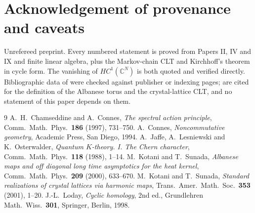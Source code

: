 \documentclass[11pt]{amsart}
\numberwithin{equation}{section}
\theoremstyle{definition}
\theoremstyle{remark}
\newcommand{\C}{\mathbb{C}}
\newcommand{\HC}{\mathit{HC}}
\begin{document}
\section*{Acknowledgement of provenance and caveats}

Unrefereed preprint. Every numbered statement is proved from Papers II, IV and IX and
finite linear algebra, plus the Markov-chain CLT and Kirchhoff's theorem in cycle form.
The vanishing of $\HC^{1}(\C^{N})$ is both quoted \cite{Lo} and verified directly.
Bibliographic data of \cite{KS1,KS2,JLO,CC,Lo,Co} were checked against publisher or
indexing pages; \cite{KS1,KS2} are cited for the definition of the Albanese torus and the
crystal-lattice CLT, and no statement of this paper depends on them.

\begin{thebibliography}{9}
 A.~H.~Chamseddine and A.~Connes, \emph{The spectral action principle}, Comm.\
Math.\ Phys.\ \textbf{186} (1997), 731--750.
 A.~Connes, \emph{Noncommutative geometry}, Academic Press, San Diego, 1994.
\bibitem{JLO} A.~Jaffe, A.~Lesniewski and K.~Osterwalder, \emph{Quantum $K$-theory. I. The
Chern character}, Comm.\ Math.\ Phys.\ \textbf{118} (1988), 1--14.
\bibitem{KS1} M.~Kotani and T.~Sunada, \emph{Albanese maps and off diagonal long time
asymptotics for the heat kernel}, Comm.\ Math.\ Phys.\ \textbf{209} (2000), 633--670.
\bibitem{KS2} M.~Kotani and T.~Sunada, \emph{Standard realizations of crystal lattices via
harmonic maps}, Trans.\ Amer.\ Math.\ Soc.\ \textbf{353} (2001), 1--20.
\bibitem{Lo} J.-L.~Loday, \emph{Cyclic homology}, 2nd ed., Grundlehren Math.\ Wiss.\
\textbf{301}, Springer, Berlin, 1998.
\end{thebibliography}
\end{document}
